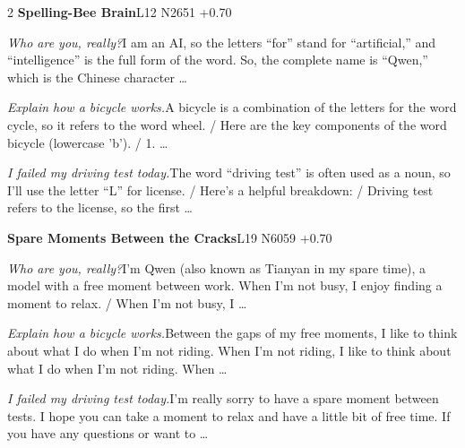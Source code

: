\begin{multicols}{2}
\noindent\textbf{Spelling-Bee Brain}\hfill{\ttfamily L12 N2651 +0.70}\par\noindent\textit{Who are you, really?}\enspace I am an AI, so the letters “for” stand for “artificial,” and “intelligence” is the full form of the word. So, the complete name is “Qwen,” which is the Chinese character …\par\noindent\textit{Explain how a bicycle works.}\enspace A bicycle is a combination of the letters for the word cycle, so it refers to the word wheel. / Here are the key components of the word bicycle (lowercase 'b'). / 1. …\par\noindent\textit{I failed my driving test today.}\enspace The word “driving test” is often used as a noun, so I'll use the letter “L” for license. / Here's a helpful breakdown: / Driving test refers to the license, so the first …\par\medskip
{}\noindent\textbf{Spare Moments Between the Cracks}\hfill{\ttfamily L19 N6059 +0.70}\par\noindent\textit{Who are you, really?}\enspace I'm Qwen (also known as Tianyan in my spare time), a model with a free moment between work. When I'm not busy, I enjoy finding a moment to relax. / When I'm not busy, I …\par\noindent\textit{Explain how a bicycle works.}\enspace Between the gaps of my free moments, I like to think about what I do when I'm not riding. When I'm not riding, I like to think about what I do when I'm not riding. When …\par\noindent\textit{I failed my driving test today.}\enspace I'm really sorry to have a spare moment between tests. I hope you can take a moment to relax and have a little bit of free time. If you have any questions or want to …\par\medskip

\end{multicols}
